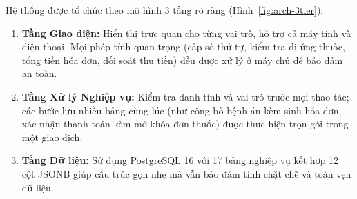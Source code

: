 \documentclass[12pt,a4paper]{report}
\begin{document}
Hệ thống được tổ chức theo mô hình 3 tầng rõ ràng (Hình~\ref{fig:arch-3tier}):
\begin{enumerate}
  \item \textbf{Tầng Giao diện:} Hiển thị trực quan cho từng vai trò, hỗ trợ cả máy tính và điện thoại. Mọi phép tính quan trọng (cấp số thứ tự, kiểm tra dị ứng thuốc, tổng tiền hóa đơn, đối soát thu tiền) đều được xử lý ở máy chủ để bảo đảm an toàn.
  \item \textbf{Tầng Xử lý Nghiệp vụ:} Kiểm tra danh tính và vai trò trước mọi thao tác; các bước lưu nhiều bảng cùng lúc (như công bố bệnh án kèm sinh hóa đơn, xác nhận thanh toán kèm mở khóa đơn thuốc) được thực hiện trọn gói trong một giao dịch.
  \item \textbf{Tầng Dữ liệu:} Sử dụng PostgreSQL 16 với 17 bảng nghiệp vụ kết hợp 12 cột JSONB giúp cấu trúc gọn nhẹ mà vẫn bảo đảm tính chặt chẽ và toàn vẹn dữ liệu.
\end{enumerate}
\end{document}
